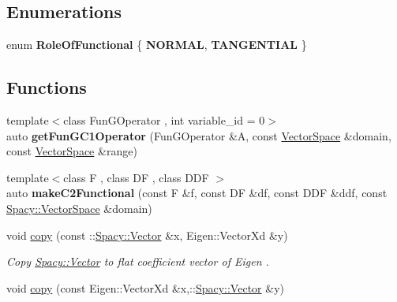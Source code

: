 \subsection*{\-Enumerations}
\begin{DoxyCompactItemize}
\item 
enum {\bfseries \-Role\-Of\-Functional} \{ {\bfseries \-N\-O\-R\-M\-A\-L}, 
{\bfseries \-T\-A\-N\-G\-E\-N\-T\-I\-A\-L}
 \}
\end{DoxyCompactItemize}
\subsection*{\-Functions}
\begin{DoxyCompactItemize}
\item 
\hypertarget{namespaceSpacy_1_1Rn_aacc9740ee75c297efc51f7cdfbe5608d}{{\footnotesize template$<$class Fun\-G\-Operator , int variable\-\_\-id = 0$>$ }\\auto {\bfseries get\-Fun\-G\-C1\-Operator} (\-Fun\-G\-Operator \&\-A, const \hyperlink{classSpacy_1_1VectorSpace}{\-Vector\-Space} \&domain, const \hyperlink{classSpacy_1_1VectorSpace}{\-Vector\-Space} \&range)}\label{namespaceSpacy_1_1Rn_aacc9740ee75c297efc51f7cdfbe5608d}

\item 
\hypertarget{namespaceSpacy_1_1Rn_af1d4ad0f90654bf2e6d3a9a2d3e5ffd1}{{\footnotesize template$<$class F , class D\-F , class D\-D\-F $>$ }\\auto {\bfseries make\-C2\-Functional} (const \-F \&f, const \-D\-F \&df, const \-D\-D\-F \&ddf, const \hyperlink{classSpacy_1_1VectorSpace}{\-Spacy\-::\-Vector\-Space} \&domain)}\label{namespaceSpacy_1_1Rn_af1d4ad0f90654bf2e6d3a9a2d3e5ffd1}

\item 
\hypertarget{namespaceSpacy_1_1Rn_a26ee11182adb7a8103aa502c4bb8a134}{void \hyperlink{namespaceSpacy_1_1Rn_a26ee11182adb7a8103aa502c4bb8a134}{copy} (const \-::\hyperlink{classSpacy_1_1Vector}{\-Spacy\-::\-Vector} \&x, \-Eigen\-::\-Vector\-Xd \&y)}\label{namespaceSpacy_1_1Rn_a26ee11182adb7a8103aa502c4bb8a134}

\begin{DoxyCompactList}\small\item\em \-Copy \hyperlink{classSpacy_1_1Vector}{\-Spacy\-::\-Vector} to flat coefficient vector of \-Eigen . \end{DoxyCompactList}\item 
\hypertarget{namespaceSpacy_1_1Rn_aa1b7ffd8e9af414e4e5118f39971ecc4}{void \hyperlink{namespaceSpacy_1_1Rn_aa1b7ffd8e9af414e4e5118f39971ecc4}{copy} (const \-Eigen\-::\-Vector\-Xd \&x,\-::\hyperlink{classSpacy_1_1Vector}{\-Spacy\-::\-Vector} \&y)}\label{namespaceSpacy_1_1Rn_aa1b7ffd8e9af414e4e5118f39971ecc4}


\end{DoxyCompactItemize}
